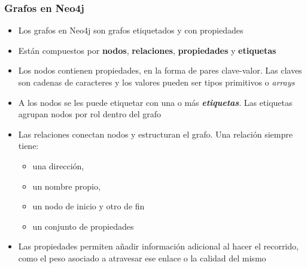 \documentclass[14pt]{beamer}
\begin{document}
\begin{frame}
\begin{itemize}
\begin{frame}[allowframebreaks]
  \frametitle{Grafos en Neo4j}
  \begin{itemize}
  \item Los grafos en Neo4j son grafos etiquetados y con propiedades
  \item Están compuestos por {\bf nodos}, {\bf relaciones}, {\bf
      propiedades} y {\bf etiquetas}
\item Los nodos contienen propiedades, en la forma de pares clave-valor.
  Las claves son cadenas de caracteres y los valores pueden ser tipos
  primitivos o {\em arrays}
\item A los nodos se les puede etiquetar con una o más {\bfseries\itshape
    etiquetas}. Las etiquetas agrupan nodos por rol dentro del grafo
\item Las relaciones conectan nodos y estructuran el grafo. Una relación
  siempre tiene:
  \begin{itemize}
  \item una dirección,
  \item un nombre propio,
  \item un nodo de inicio y otro de fin
  \item un conjunto de propiedades
  \end{itemize}
\item Las propiedades permiten añadir información adicional al hacer el
  recorrido, como el peso asociado a atravesar ese enlace o la calidad del
  mismo
  \end{itemize}
\end{frame}




\end{itemize}
\end{frame}
\end{document}
